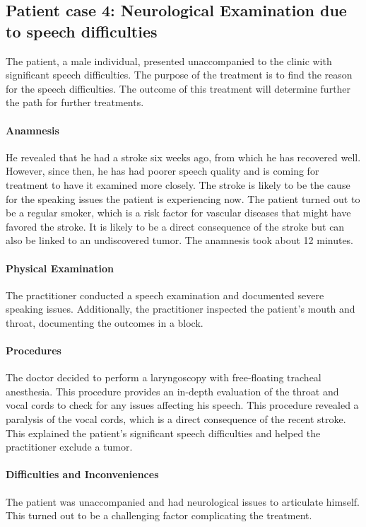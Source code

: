 \subsection{Patient case 4: Neurological Examination due to speech difficulties}\label{subsec:patient-case-4:-neurological-examination-due-to-speech-difficulties}
The patient, a male individual, presented unaccompanied to the clinic with significant speech difficulties.
The purpose of the treatment is to find the reason for the speech difficulties.
The outcome of this treatment will determine further the path for further treatments.

\paragraph{Anamnesis}
He revealed that he had a stroke six weeks ago, from which he has recovered well.
However, since then, he has had poorer speech quality and is coming for treatment to have it examined more closely.
The stroke is likely to be the cause for the speaking issues the patient is experiencing now.
The patient turned out to be a regular smoker, which is a risk factor for vascular diseases that might have favored the stroke.
It is likely to be a direct consequence of the stroke but can also be linked to an undiscovered tumor.
The anamnesis took about 12 minutes.

\paragraph{Physical Examination}
The practitioner conducted a speech examination and documented severe speaking issues.
Additionally, the practitioner inspected the patient's mouth and throat, documenting the outcomes in a  block.
\paragraph{Procedures}
The doctor decided to perform a laryngoscopy with free-floating tracheal anesthesia.
This procedure provides an in-depth evaluation of the throat and vocal cords to check for any issues affecting his speech.
This procedure revealed a paralysis of the vocal cords, which is a direct consequence of the recent stroke.
This explained the patient's significant speech difficulties and helped the practitioner exclude a tumor.

\paragraph{Difficulties and Inconveniences}
The patient was unaccompanied and had neurological issues to articulate himself.
This turned out to be a challenging factor complicating the treatment.

